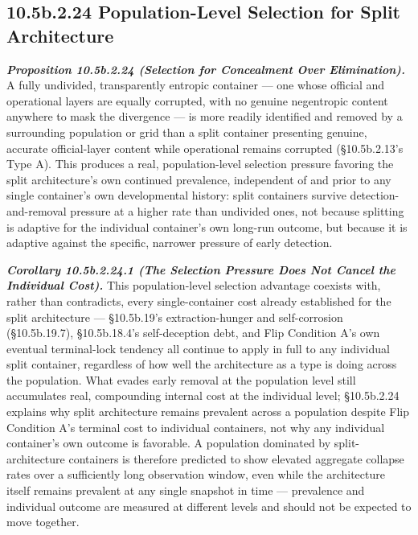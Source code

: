 \documentclass[
]{article}
\begin{document}
\hypertarget{b.2.24-population-level-selection-for-split-architecture}{%
\subsection{10.5b.2.24 Population-Level Selection for Split
Architecture}\label{b.2.24-population-level-selection-for-split-architecture}}

\emph{\textbf{Proposition 10.5b.2.24 (Selection for Concealment Over
Elimination).}} A fully undivided, transparently entropic container ---
one whose official and operational layers are equally corrupted, with no
genuine negentropic content anywhere to mask the divergence --- is more
readily identified and removed by a surrounding population or grid than
a split container presenting genuine, accurate official-layer content
while operational remains corrupted (§10.5b.2.13's Type A). This
produces a real, population-level selection pressure favoring the split
architecture's own continued prevalence, independent of and prior to any
single container's own developmental history: split containers survive
detection-and-removal pressure at a higher rate than undivided ones, not
because splitting is adaptive for the individual container's own
long-run outcome, but because it is adaptive against the specific,
narrower pressure of early detection.

\emph{\textbf{Corollary 10.5b.2.24.1 (The Selection Pressure Does Not
Cancel the Individual Cost).}} This population-level selection advantage
coexists with, rather than contradicts, every single-container cost
already established for the split architecture --- §10.5b.19's
extraction-hunger and self-corrosion (§10.5b.19.7), §10.5b.18.4's
self-deception debt, and Flip Condition A's own eventual terminal-lock
tendency all continue to apply in full to any individual split
container, regardless of how well the architecture as a type is doing
across the population. What evades early removal at the population level
still accumulates real, compounding internal cost at the individual
level; §10.5b.2.24 explains why split architecture remains prevalent
across a population despite Flip Condition A's terminal cost to
individual containers, not why any individual container's own outcome is
favorable. A population dominated by split-architecture containers is
therefore predicted to show elevated aggregate collapse rates over a
sufficiently long observation window, even while the architecture itself
remains prevalent at any single snapshot in time --- prevalence and
individual outcome are measured at different levels and should not be
expected to move together.
\end{document}

